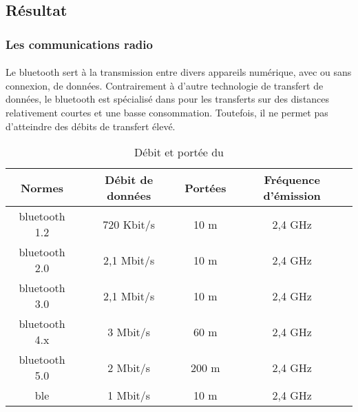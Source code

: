 \subsection{Résultat}
\label{sec:comparaisonProtocoleCommnunicationResultats}

\subsubsection{Les communications radio}
\label{sec:communicationRadio}

\paragraph{}
\label{sec:wifi}

\paragraph{}
\label{sec:bluetooth}

Le \gls{bluetooth} sert à la transmission entre divers appareils numérique, avec ou sans connexion,
de données. Contrairement à d'autre technologie de transfert de données, le \gls{bluetooth} est
spécialisé dans pour les transferts sur des distances relativement courtes et une basse
consommation. Toutefois, il ne permet pas d'atteindre des débits de transfert élevé.

\begin{table}[ht]
    \centering
    \begin{tabular}{|c|c|c|c|}
        \hline
        \rowcolor{tableColorDark} Normes & Débit de données & Portées & Fréquence d'émission \\
        \hline

        \gls{bluetooth} 1.2              & 720 Kbit/s       & 10 m    & 2,4 GHz              \\\hline
        \gls{bluetooth} 2.0              & 2,1 Mbit/s       & 10 m    & 2,4 GHz              \\\hline
        \gls{bluetooth} 3.0              & 2,1 Mbit/s       & 10 m    & 2,4 GHz              \\\hline
        \gls{bluetooth} 4.x              & 3 Mbit/s         & 60 m    & 2,4 GHz              \\\hline
        \gls{bluetooth} 5.0              & 2 Mbit/s         & 200 m   & 2,4 GHz              \\\hline
        \gls{ble}                        & 1 Mbit/s         & 10 m    & 2,4 GHz              \\\hline
    \end{tabular}
    \label{tab:debitPorteeBluetooth}
    \caption{Débit et portée du }
    \nocite{debitPortee}
    \nocite{ble}
\end{table}

